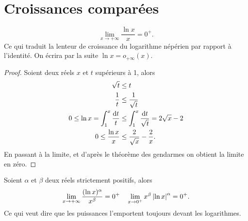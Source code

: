 \section{Croissances comparées}
\label{sec:chap1-croissancescomparees}
\begin{theo} 
  \begin{equation} 
    \lim\limits_{x \to +\infty} \frac{\ln x}{x}=0^+.
  \end{equation} 
  Ce qui traduit la \og lenteur \fg{} de croissance du logarithme népérien par rapport à l'identité. On écrira par la suite $\ln x=o_{+\infty}(x)$.
\end{theo}
\begin{proof} 
  Soient deux réels $x$ et $t$ supérieurs à 1, alors 
  \begin{align}
    \sqrt{t} & \leq t \\
    \frac{1}{t} &\leq \frac{1}{\sqrt{t}}\\
    0 \leq \ln x = \int_{1}^{x} \frac{\mathop{}\mathopen{}\mathrm{d} t}{t} &\leq \int_1^x\frac{\mathop{}\mathopen{}\mathrm{d} t}{\sqrt{t}}=2\sqrt{x}-2\\
    0 \leq \frac{\ln x}{x} &\leq \frac{2}{\sqrt{x}} - \frac{2}{x}.
  \end{align}
  En passant à la limite, et d'après le théorème des gendarmes on obtient la limite en zéro.
\end{proof}
%
\begin{prop}
  \label{prop-chap1:croissancecomparelnpuissance}
  Soient $\alpha$ et $\beta$ deux réels strictement positifs, alors 
  \begin{equation} 
    \lim\limits_{x \to +\infty} \frac{(\ln x)^\alpha}{x^\beta} = 0^+ \quad \lim\limits_{x \to 0^+} x^\beta \left\lvert\ln x\right\rvert^\alpha=0^+.
  \end{equation} 
  Ce qui veut dire que les puissances \og l'emportent \fg{} toujours devant les logarithmes.
\end{prop}
